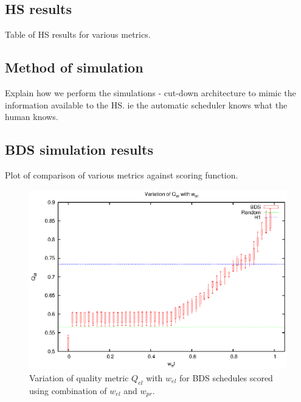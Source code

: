 \subsection{HS results}
Table of HS results for various metrics.

\subsection{Method of simulation}
Explain how we perform the simulations - cut-down architecture to mimic the information available to the HS. ie the automatic scheduler knows what the human knows.

\subsection{BDS simulation results}
Plot of comparison of various metrics against scoring function.

\begin{figure}[htbp]
\begin{center}
    \includegraphics[scale=1.0, angle=0]{figures/mam/cmp_el.eps}
    \caption[Variation of $Q_{el}$ with $w_{el}$.]
      {Variation of quality metric $Q_{el}$ with $w_{el}$ for BDS schedules scored using combination of $w_{el}$ and $w_{pr}$.}
\label{fig:mam_cmp_el}
\end{center}
\end{figure}


